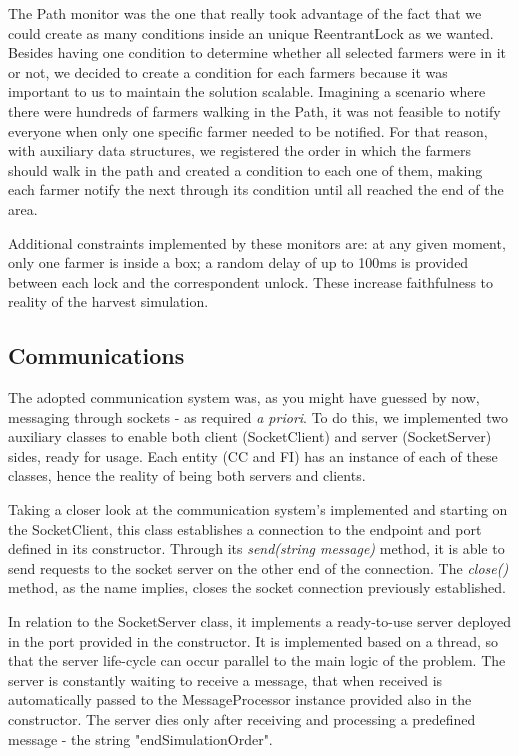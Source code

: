 \documentclass[12pt]{article}
\begin{document}
The Path monitor was the one that really took advantage of the fact that we could create as many conditions inside an unique ReentrantLock as we wanted. 
Besides having one condition to determine whether all selected farmers were in it or not, we decided to create a condition for each farmers because it was 
important to us to maintain the solution scalable. 
Imagining a scenario where there were hundreds of farmers walking in the Path, it was not feasible to notify everyone when only one specific farmer needed to be notified. 
For that reason, with auxiliary data structures, we registered the order in which the farmers should walk in the path and created a condition to each one of them, 
making each farmer notify the next through its condition until all reached the end of the area.

Additional constraints implemented by these monitors are: at any given moment, only one farmer is inside a box; a random delay of up to 100ms is provided 
between each lock and the correspondent unlock.
These increase faithfulness to reality of the harvest simulation.

\subsection{Communications} \label{communications} %

The adopted communication system was, as you might have guessed by now, messaging through sockets - as required \textit{a priori}. %
To do this, we implemented two auxiliary classes to enable both client (SocketClient) and server (SocketServer) sides, ready for usage. 
Each entity (CC and FI) has an instance of each of these classes, hence the reality of being both servers and clients.

Taking a closer look at the communication system's implemented and starting on the SocketClient, this class establishes a connection to the endpoint and port 
defined in its constructor.
Through its \textit{send(string message)} method, it is able to send requests to the socket server on the other end of the connection.
The \textit{close()} method, as the name implies, closes the socket connection previously established.

In relation to the SocketServer class, it implements a ready-to-use server deployed in the port provided in the constructor. 
It is implemented based on a thread, so that the server life-cycle can occur parallel to the main logic of the problem. 
The server is constantly waiting to receive a message, that when received is automatically passed to the MessageProcessor instance provided also in the constructor. 
The server dies only after receiving and processing a predefined message - the string "endSimulationOrder".
\end{document}
